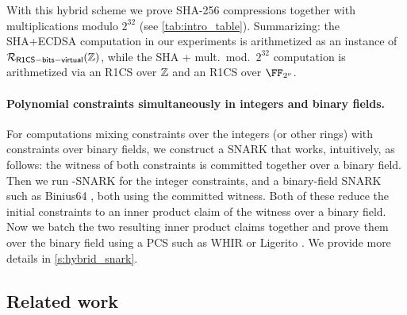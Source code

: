 With this hybrid scheme  we  prove SHA-256 compressions together with multiplications modulo $2^{32}$ (see \cref{tab:intro_table}). Summarizing: the SHA+ECDSA computation in our experiments is arithmetized as an instance of $\mathcal{R}_{\mathsf{R1CS-bits-virtual}}(\mathbb{Z})$, while the SHA + mult.\ mod.\ $2^{32}$ computation is arithmetized via an R1CS over $\mathbb{Z}$ and an R1CS over $\comfield$.

\paragraph{Polynomial constraints simultaneously in integers and binary fields.} For computations mixing constraints over the integers (or other rings) with constraints over binary fields, we construct a SNARK that works, intuitively, as follows: the witness of both constraints is committed together over a binary field. Then we run  \ftwoz-SNARK  for the integer constraints, and  a binary-field SNARK such as Binius64 \cite{binius64}, both using the committed witness. Both of these  reduce the initial constraints to an inner product claim of the witness over a binary field. Now we batch the two resulting inner product claims together and prove them over the binary field using a PCS such as WHIR \cite{whir} or Ligerito \cite{Ligerito}. We provide more details in \cref{s:hybrid_snark}. 




\subsection{Related work}\label{s:related_work}


\iflncs

